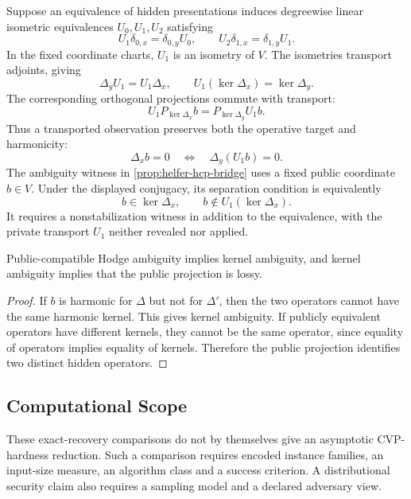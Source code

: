 Suppose an equivalence of hidden presentations induces degreewise linear
isometric equivalences
\(U_0,U_1,U_2\) satisfying
\[
  U_1\delta_{0,x}=\delta_{0,y}U_0,
  \qquad
  U_2\delta_{1,x}=\delta_{1,y}U_1.
\]
In the fixed coordinate charts, \(U_1\) is an isometry of \(V\). The
isometries transport adjoints, giving
\[
  \Delta_yU_1=U_1\Delta_x,
  \qquad
  U_1(\ker\Delta_x)=\ker\Delta_y.
\]
The corresponding orthogonal projections commute with transport:
\[
  U_1P_{\ker\Delta_x}b
  =
  P_{\ker\Delta_y}U_1b.
\]
Thus a transported observation preserves both the operative target and
harmonicity:
\[
  \Delta_xb=0
  \quad\Longleftrightarrow\quad
  \Delta_y(U_1b)=0.
\]
The ambiguity witness in \cref{prop:helfer-hcp-bridge} uses a fixed public
coordinate \(b\in V\). Under the displayed conjugacy, its separation condition is
equivalently
\[
  b\in\ker\Delta_x,
  \qquad
  b\notin U_1(\ker\Delta_x).
\]
It requires a nonstabilization witness in addition to the equivalence, with
the private transport \(U_1\) neither revealed nor applied.

\begin{proposition}\label{prop:ambiguity-hierarchy}
  Public-compatible Hodge ambiguity implies kernel ambiguity, and kernel
  ambiguity implies that the public projection is lossy.
\end{proposition}

\begin{proof}
  If \(b\) is harmonic for \(\Delta\) but not for \(\Delta'\), then the two
  operators cannot have the same harmonic kernel. This gives kernel ambiguity.
  If publicly equivalent operators have different kernels, they cannot be the
  same operator, since equality of operators implies equality of kernels.
  Therefore the public projection identifies two distinct hidden operators.
\end{proof}

\subsection{Computational Scope}\label{sec:computational-scope}

These exact-recovery comparisons do not by themselves give an asymptotic
CVP-hardness reduction. Such a comparison requires encoded instance families,
an input-size measure, an algorithm class and a success criterion. A
distributional security claim also requires a sampling model and a declared
adversary view.
